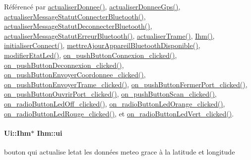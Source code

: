 Référencé par \hyperlink{class_ihm_a7c0a160f30e11a4f8d56b174e07566fe}{actualiser\+Donnee()}, \hyperlink{class_ihm_a3ca276093d65c42a5fc5a87cbca1972a}{actualiser\+Donnee\+Gps()}, \hyperlink{class_ihm_a5d7e6bdacfedc0f0dc4d7b3516454788}{actualiser\+Message\+Statut\+Connecter\+Bluetooth()}, \hyperlink{class_ihm_ad73cc62bafa9c43288f69fbac2b80508}{actualiser\+Message\+Statut\+Deconnecter\+Bluetooth()}, \hyperlink{class_ihm_a29b4c5fba871a30f7f2e5fbe08a2087d}{actualiser\+Message\+Statut\+Erreur\+Bluetooth()}, \hyperlink{class_ihm_a94ea90d27fc0aa7598cf270dd3be98eb}{actualiser\+Trame()}, \hyperlink{class_ihm_a50a7a15775452923868348bdbe4fa51e}{Ihm()}, \hyperlink{class_ihm_a2ef778196b2eba5b0ab5cb4e066bc3b7}{initialiser\+Connect()}, \hyperlink{class_ihm_a9d9ac22e5d73a010bc75a1fcf2e7ddcb}{mettre\+Ajour\+Appareil\+Bluetooth\+Disponible()}, \hyperlink{class_ihm_af0426507c2130aefd01bdb4f825ae168}{modifier\+Etat\+Led()}, \hyperlink{class_ihm_abf61dda1820e5632485de93983c40196}{on\+\_\+push\+Button\+Connexion\+\_\+clicked()}, \hyperlink{class_ihm_ad176c58fb3c583286544f010ac006b66}{on\+\_\+push\+Button\+Deconnexion\+\_\+clicked()}, \hyperlink{class_ihm_a850d1c97ed5fe5ba3cf3aa85d81872cd}{on\+\_\+push\+Button\+Envoyer\+Coordonnee\+\_\+clicked()}, \hyperlink{class_ihm_afd32da9e614eba44bb1d3630b48e6075}{on\+\_\+push\+Button\+Envoyer\+Trame\+\_\+clicked()}, \hyperlink{class_ihm_abcdae03ce7e83266fb9d3e795df8a171}{on\+\_\+push\+Button\+Fermer\+Port\+\_\+clicked()}, \hyperlink{class_ihm_a9ce167b94baead6e318bbd0c5254f842}{on\+\_\+push\+Button\+Ouvrir\+Port\+\_\+clicked()}, \hyperlink{class_ihm_a277763bdb63ed529aafba7db513cb630}{on\+\_\+push\+Button\+Scan\+\_\+clicked()}, \hyperlink{class_ihm_a1e328a2e8165bbef347e901f1bc5534d}{on\+\_\+radio\+Button\+Led\+Off\+\_\+clicked()}, \hyperlink{class_ihm_a7e000e198b11fc38a4459f7749561ded}{on\+\_\+radio\+Button\+Led\+Orange\+\_\+clicked()}, \hyperlink{class_ihm_a731ee780915cb90a5dfb11f2e02144c9}{on\+\_\+radio\+Button\+Led\+Rouge\+\_\+clicked()}, et \hyperlink{class_ihm_afef5bfaa83383427e615d21d9474f466}{on\+\_\+radio\+Button\+Led\+Vert\+\_\+clicked()}.

\paragraph[{\texorpdfstring{ui}{ui}}]{\setlength{\rightskip}{0pt plus 5cm}Ui\+::\+Ihm$\ast$ Ihm\+::ui\hspace{0.3cm}{\ttfamily [private]}}\hypertarget{class_ihm_a0ac5f47856566ceeeca1720109bf70ea}{}\label{class_ihm_a0ac5f47856566ceeeca1720109bf70ea}
bouton qui actualise l\textquotesingle{}etat les données meteo grace à la latitude et longitude 

